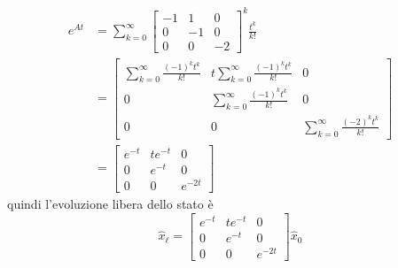 \documentclass{article}
\numberwithin{equation}{subsection}
\begin{document}
\begin{align*}
    e^{\hat A t} &= \sum_{k=0}^\infty \begin{bmatrix}
        -1 & 1 & 0\\
        0 & -1 & 0\\
        0 & 0 & -2
    \end{bmatrix}^k \frac{t^k}{k!}\\
    &= \begin{bmatrix}
        \sum\limits_{k=0}^\infty \frac{(-1)^k t^k}{k!} & t \sum\limits_{k=0}^\infty \frac{(-1)^k t^k}{k!} & 0\\
        0 & \sum\limits_{k=0}^\infty \frac{(-1)^k t^k}{k!} & 0\\
        0 & 0 & \sum\limits_{k=0}^\infty \frac{(-2)^k t^k}{k!}
    \end{bmatrix}\\
    &= \begin{bmatrix}
        e^{-t} & te^{-t} & 0\\
        0 & e^{-t} & 0\\
        0 & 0 & e^{-2t}
    \end{bmatrix}
\end{align*}
quindi l'evoluzione libera dello stato è
\begin{equation}
    \hat x_\ell = 
    \begin{bmatrix}
        e^{-t} & te^{-t} & 0\\
        0 & e^{-t} & 0\\
        0 & 0 & e^{-2t}
    \end{bmatrix} \hat x_0
\end{equation}
\end{document}
